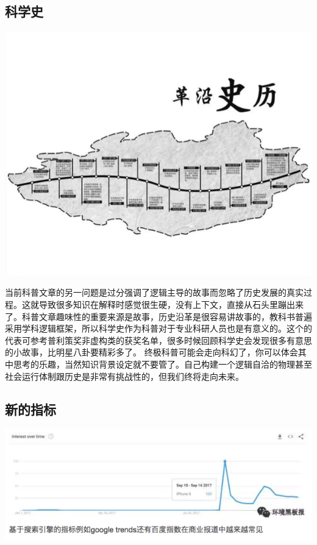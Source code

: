 \documentclass[]{book}
\begin{document}
\subsection{科学史}

\includegraphics[width=8.33in]{images/pops7}

当前科普文章的另一问题是过分强调了逻辑主导的故事而忽略了历史发展的真实过程。这就导致很多知识在解释时感觉很生硬，没有上下文，直接从石头里蹦出来了。科普文章趣味性的重要来源是故事，历史沿革是很容易讲故事的，教科书普遍采用学科逻辑框架，所以科学史作为科普对于专业科研人员也是有意义的。这个的代表可参考普利策奖非虚构类的获奖名单，很多时候回顾科学史会发现很多有意思的小故事，比明星八卦要精彩多了。
终极科普可能会走向科幻了，你可以体会其中思考的乐趣，当然知识背景设定就不要管了。自己构建一个逻辑自洽的物理甚至社会运行体制跟历史是非常有挑战性的，但我们终将走向未来。

\subsection{新的指标}

\includegraphics[width=8.33in]{images/pops8}
\end{document}
